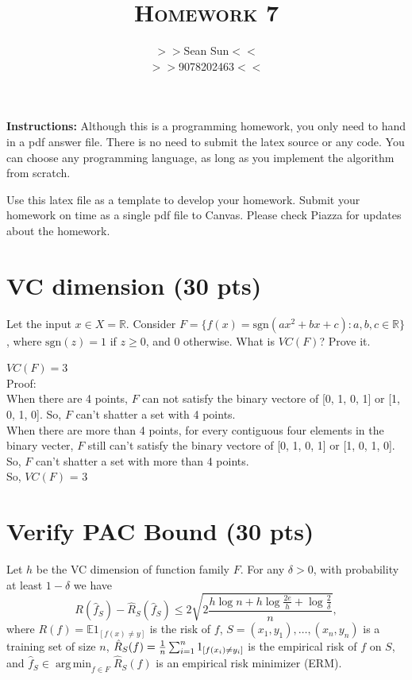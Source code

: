 \documentclass[a4paper]{article}
\title{\textsc{Homework 7}} %
\author{
$>>$Sean Sun$<<$ \\
$>>$9078202463$<<$\\
}
\date{}
\theoremstyle{definition}
\DeclareMathOperator*{\argmin}{arg\,min}
\newcommand{\sgn}{\mathrm{sgn}}
\def\E{\mathbb E}
\def\R{\mathbb R}
\newenvironment{soln}{
    \leavevmode\color{blue}\ignorespaces
}{}
\begin{document}
\maketitle 


\textbf{Instructions:} 
Although this is a programming homework, you only need to hand in a pdf answer file.
There is no need to submit the latex source or any code.
You can choose any programming language, as long as you implement the algorithm from scratch.

Use this latex file as a template to develop your homework.
Submit your homework on time as a single pdf file to Canvas.
Please check Piazza for updates about the homework.


\section{VC dimension (30 pts)}
Let the input $x\in X=\R$.
Consider $F=\{f(x)=\sgn(ax^2+bx+c): a, b, c \in \R\}$, where $\sgn(z)=1$ if $z\ge0$, and 0 otherwise.
What is $VC(F)$?  Prove it.

\begin{soln}
$VC(F) = 3$\\
Proof:
\\When there are 4 points, $F$ can not satisfy the binary vectore of [0, 1, 0, 1] or [1, 0, 1, 0]. So, $F$ can't shatter a set with 4 points. 
\\When there are more than 4 points, for every contiguous four elements in the binary vecter, $F$ still can't satisfy the binary vectore of [0, 1, 0, 1] or [1, 0, 1, 0]. So, $F$ can't shatter a set with more than 4 points.
\\So, $VC(F)$ = 3
\end{soln}


\section{Verify PAC Bound (30 pts)}
Let $h$ be the VC dimension of function family $F$.
For any $\delta>0$, with probability at least $1-\delta$ we have
$$R(\hat f_S) - \hat R_S(\hat f_S) \le 2 \sqrt{2 \frac{h \log n + h \log\frac{2e}{h}  + \log \frac{2}{\delta} }{n}},$$
where $R(f) = \E 1_{[f(x)\neq y]}$ is the risk of $f$,
$S=(x_1,y_1), \ldots, (x_n, y_n)$ is a training set of size $n$,
$\hat R_S(f) = {1\over n} \sum_{i=1}^n 1_{[f(x_i)\neq y_i]}$ is the empirical risk of $f$ on $S$,
and 
$\hat f_S \in \argmin_{f\in F} \hat R_S(f)$ is an empirical risk minimizer (ERM).
\end{document}
